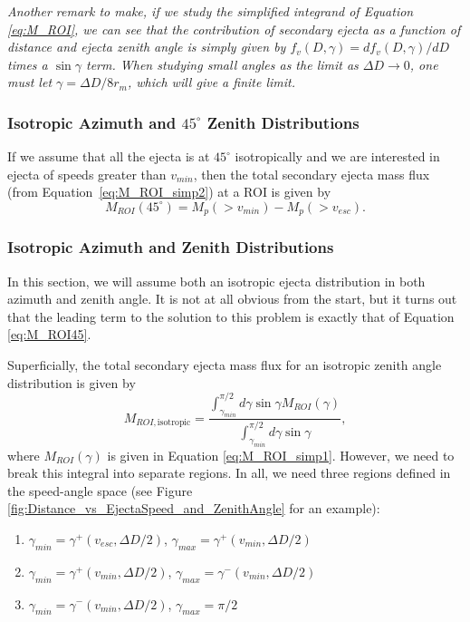 \documentclass{hitec}
\numberwithin{equation}{section}
\begin{document}
\textit{Another remark to make, if we study the simplified integrand of Equation \eqref{eq:M_ROI}, we can see that the contribution of secondary ejecta as a function of distance and ejecta zenith angle is simply given by
$f_v(D,\gamma) = df_v(D,\gamma)/dD$ times a $\sin\gamma$ term. When studying small angles as the limit as $\Delta D\to 0$, one must let $\gamma=\Delta D/8r_m$, which will give a finite limit.}


\subsubsection{Isotropic Azimuth and $45^\circ$ Zenith Distributions}\label{sssec:IsoAzm45Zen}
If we assume that all the ejecta is at $45^\circ$ isotropically and we are interested in ejecta of speeds greater than $v_{min}$, then the total secondary ejecta mass flux (from Equation~\eqref{eq:M_ROI_simp2}) at a ROI is given by
\begin{equation}\label{eq:M_ROI45}
M_{ROI}(45^\circ) = M_p(>v_{min}) - M_p(>v_{esc}).
\end{equation}


\subsubsection{Isotropic Azimuth and Zenith Distributions}
In this section, we will assume both an isotropic ejecta distribution in both azimuth and zenith angle. It is not at all obvious from the start, but it turns out that the leading term to the solution to this problem is exactly that of Equation \eqref{eq:M_ROI45}.

Superficially, the total secondary ejecta mass flux for an isotropic zenith angle distribution is given by
\begin{equation}\label{eq:M_ROIiso1}
M_{ROI,\text{isotropic}} = \frac{\int_{\gamma_{min}}^{\pi/2}d\gamma\sin\gamma M_{ROI}(\gamma)}{\int_{\gamma_{min}}^{\pi/2}d\gamma\sin\gamma},
\end{equation}
where $M_{ROI}(\gamma)$ is given in Equation \eqref{eq:M_ROI_simp1}. However, we need to break this integral into separate regions. In all, we need three regions defined in the speed-angle space (see Figure \ref{fig:Distance_vs_EjectaSpeed_and_ZenithAngle} for an example):
\begin{enumerate}[label=Region \Roman*:]
	\item $\gamma_{min} = \gamma^+(v_{esc},\Delta D/2)$, $\gamma_{max} = \gamma^+(v_{min}, \Delta D/2)$
	\item $\gamma_{min} = \gamma^+(v_{min}, \Delta D/2)$, $\gamma_{max} = \gamma^-(v_{min}, \Delta D/2)$
	\item $\gamma_{min} = \gamma^-(v_{min}, \Delta D/2)$, $\gamma_{max} = \pi/2$
\end{enumerate}
\end{document}
